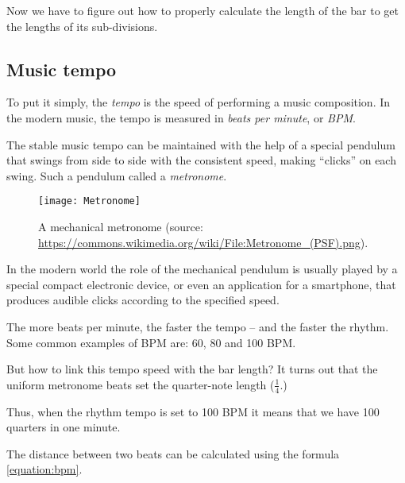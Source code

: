 \documentclass[../sparc.tex]{subfiles}
\begin{document}
Now we have to figure out how to properly calculate the length of the bar to get
the lengths of its sub-divisions.

\subsection{Music tempo}

To put it simply, the \emph{tempo} is the speed of performing a music
composition.  In the modern music, the tempo is measured in \emph{beats per
minute}, or \emph{BPM}.

The stable music tempo can be maintained with the help of a special pendulum
that swings from side to side with the consistent speed, making ``clicks'' on
each swing.  Such a pendulum called a \emph{metronome}.

\begin{figure}[h]
  \centering
  \texttt{[image: Metronome]}
  \caption{A mechanical metronome (source:
    \url{https://commons.wikimedia.org/wiki/File:Metronome_(PSF).png}).}
  \label{fig:sound-metronome}
\end{figure}

In the modern world the role of the mechanical pendulum is usually played by a
special compact electronic device, or even an application for a smartphone, that
produces audible clicks according to the specified speed.

The more beats per minute, the faster the tempo -- and the faster the rhythm.
Some common examples of \gls{BPM} are: 60, 80 and 100 BPM.

But how to link this tempo speed with the bar length?  It turns out that the
uniform metronome beats set the quarter-note length ($\frac{1}{4}$.)

Thus, when the rhythm tempo is set to 100 BPM it means that we have 100 quarters
in one minute.


The distance between two beats can be calculated using the formula
\ref{equation:bpm}.
\end{document}
